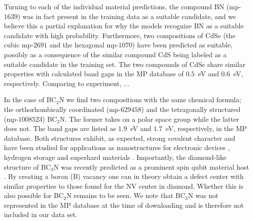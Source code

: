 \documentclass[superscriptaddress,unsortedaddress,
 amsmath,amssymb,
 aps,
]{revtex4-2}
\begin{document}
  
Turning to each of the individual material predictions, the compound BN (mp-$1639$) was in fact present in the training data as a suitable candidate, and we believe this a partial explanation for why the models recognize BN as a suitable candidate with high probability. Furthermore, two compositions of CdSe (the cubic mp-$2691$ and the hexagonal mp-$1070$) have been predicted as suitable, possibly as a consequence of the similar compound CdS being labeled as a suitable candidate in the training set. 
The two compounds of CdSe share similar properties with calculated band gaps in the MP database of $0.5$~eV and $0.6$~eV, respectively. Comparing to experiment, ... 

In the case of BC$_2$N we find two compositions with the same chemical formula; the orthorhombically coordinated (mp-$629458$) and the tetragonally structured (mp-$1008523$) BC$_2$N. The former takes on a polar space group while the latter does not. The band gaps are listed as $1.9$~eV and $1.7$~eV, respectively, in the MP database. 
Both structures exhibit, as expected, strong covalent character and have been studied for applications as nanostructures for electronic devices \cite{Gao2017}, hydrogen storage \cite{Cai2017} and superhard materials \cite{Li2017, Jiang2020}. Importantly, the diamond-like structure of BC$_3$N was recently predicted as a prominent spin qubit material host \cite{Wang2020SpinQB}. By creating a boron (B) vacancy one can in theory obtain a defect center with similar properties to those found for the NV center in diamond. Whether this is also possible for BC$_2$N remains to be seen. We note that BC$_3$N was not represented in the MP database at the time of downloading and is therefore not included in our data set. 
\end{document}
